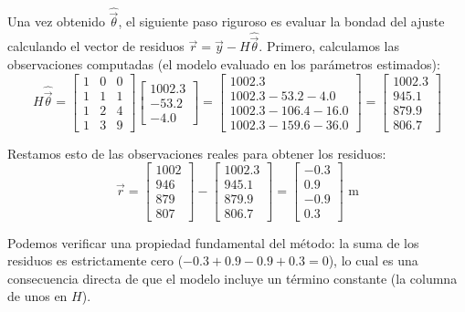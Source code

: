 Una vez obtenido $\hat{\vec{\theta}}$, el siguiente paso riguroso es evaluar la bondad del ajuste calculando el vector de residuos $\vec{r} = \vec{y} - H\hat{\vec{\theta}}$. Primero, calculamos las observaciones computadas (el modelo evaluado en los parámetros estimados):
$$ H\hat{\vec{\theta}} = \begin{bmatrix} 1 & 0 & 0 \\ 1 & 1 & 1 \\ 1 & 2 & 4 \\ 1 & 3 & 9 \end{bmatrix} \begin{bmatrix} 1002.3 \\ -53.2 \\ -4.0 \end{bmatrix} = \begin{bmatrix} 1002.3 \\ 1002.3 - 53.2 - 4.0 \\ 1002.3 - 106.4 - 16.0 \\ 1002.3 - 159.6 - 36.0 \end{bmatrix} = \begin{bmatrix} 1002.3 \\ 945.1 \\ 879.9 \\ 806.7 \end{bmatrix} $$

Restamos esto de las observaciones reales para obtener los residuos:
$$ \vec{r} = \begin{bmatrix} 1002 \\ 946 \\ 879 \\ 807 \end{bmatrix} - \begin{bmatrix} 1002.3 \\ 945.1 \\ 879.9 \\ 806.7 \end{bmatrix} = \begin{bmatrix} -0.3 \\ 0.9 \\ -0.9 \\ 0.3 \end{bmatrix} \text{ m} $$

Podemos verificar una propiedad fundamental del método: la suma de los residuos es estrictamente cero ($-0.3 + 0.9 - 0.9 + 0.3 = 0$), lo cual es una consecuencia directa de que el modelo incluye un término constante (la columna de unos en $H$). 

